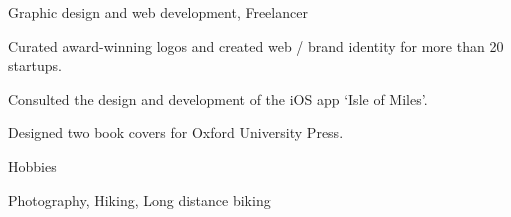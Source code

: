 


\begin{cventries}


\cventry
{} %
{Graphic design and web development, Freelancer} %
{} %
{} %
{ %
\begin{cvitems}
\item {Curated award-winning logos and created web / brand identity for more than 20 startups.}
\item {Consulted the design and development of the iOS app `Isle of Miles'.}
\item {Designed two book covers for Oxford University Press.}
\end{cvitems}
}


\cventry
{} %
{Hobbies} %
{} %
{} %
{ %
\begin{cvitems}
\item {Photography, Hiking, Long distance biking}
\end{cvitems}
}

\end{cventries}
